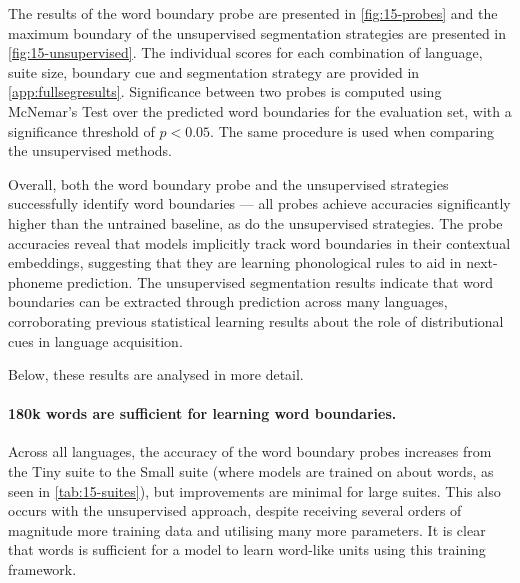 
The results of the word boundary probe are presented in \cref{fig:15-probes} and the maximum boundary \fscores of the unsupervised segmentation strategies are presented in \cref{fig:15-unsupervised}. The individual scores for each combination of language, suite size, boundary cue and segmentation strategy are provided in \cref{app:fullsegresults}. Significance between two probes is computed using McNemar's Test \citep{McNemar_1947} over the predicted word boundaries for the evaluation set, with a significance threshold of $p<0.05$. The same procedure is used when comparing the unsupervised methods.

Overall, both the word boundary probe and the unsupervised strategies successfully identify word boundaries --- all probes achieve accuracies significantly higher than the untrained baseline, as do the unsupervised strategies. The probe accuracies reveal that models implicitly track word boundaries in their contextual embeddings, suggesting that they are learning phonological rules to aid in next-phoneme prediction. The unsupervised segmentation results indicate that word boundaries can be extracted through prediction across many languages, corroborating previous statistical learning results about the role of distributional cues in language acquisition.

Below, these results are analysed in more detail.

\paragraph{180k words are sufficient for learning word boundaries.}
Across all languages, the accuracy of the word boundary probes increases from the Tiny suite to the Small suite (where models are trained on about  words, as seen in \cref{tab:15-suites}), but improvements are minimal for large suites. This also occurs with the unsupervised approach, despite receiving several orders of magnitude more training data and utilising many more parameters. It is clear that  words is sufficient for a model to learn word-like units using this training framework.

